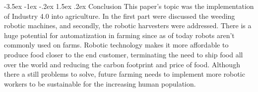 \documentclass[a4paper,10pt]{article}
\makeatletter
\theoremstyle{definition}
\renewcommand\section{\@startsection {section}{1}{\z@}%
                                   {-3.5ex \@plus -1ex \@minus -.2ex}%
                                   {1.5ex \@plus.2ex}%
                                   {\large\bfseries}}
\makeatother
\begin{document}
\smallskip

\section{Conclusion}
\label{sec:5}
This paper's topic was the implementation of Industry 4.0 into agriculture. In the first part were discussed the weeding robotic machines, and secondly, the robotic harvesters were addressed. There is a huge potential for automatization in farming since as of today robots aren't commonly used on farms. Robotic technology makes it more affordable to produce food closer to the end customer, terminating the need to ship food all over the world and reducing the carbon footprint and price of food. Although there a still problems to solve, future farming needs to implement more robotic workers to be sustainable for the increasing human population.
\newpage

%
\begingroup
\makeatletter
\renewcommand\section{\@startsection {section}{1}{\z@}%
                                   {-3.5ex \@plus -1ex \@minus -.2ex}%
                                   {4.5ex \@plus.2ex}%
                                   {\large\bfseries}}
\makeatother


{}

\endgroup
\end{document}
